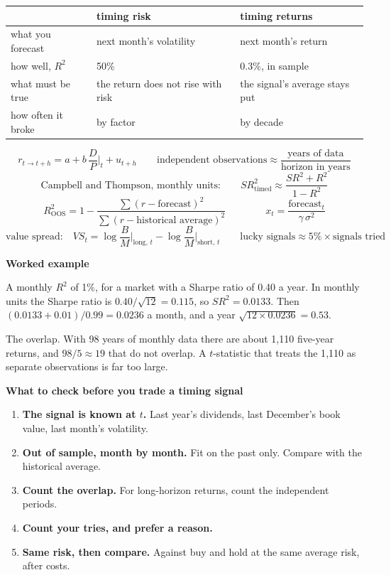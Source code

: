 \documentclass[11pt]{article}
\newcounter{ex}[section]
\newcommand{\head}[1]{\par\medskip\textbf{#1}\par}
\newcommand{\SR}{\mathit{SR}}
\begin{document}
\begin{center}
\begin{tabular}{lll}
\toprule
 & timing risk & timing returns \\
\midrule
what you forecast & next month's volatility & next month's return \\
how well, $R^{2}$ & 50\% & 0.3\%, in sample \\
what must be true & the return does not rise with risk & the signal's average stays put \\
how often it broke & by factor & by decade \\
\bottomrule
\end{tabular}
\end{center}

\begin{keybox}
\[ r_{t\to t+h} = a + b\,\frac{D}{P}\Big|_{t} + u_{t+h} \qquad
   \text{independent observations} \approx \frac{\text{years of data}}{\text{horizon in years}} \]
\[ \text{Campbell and Thompson, monthly units:}\qquad \SR^{2}_{\text{timed}} \approx \frac{\SR^{2} + R^{2}}{1 - R^{2}} \]
\[ R^{2}_{\text{OOS}} = 1 - \frac{\sum(r - \text{forecast})^{2}}{\sum(r - \text{historical average})^{2}}
   \qquad\qquad x_{t} = \frac{\text{forecast}_{t}}{\gamma\,\sigma^{2}} \]
\[ \text{value spread:}\quad VS_{t} = \log\frac{B}{M}\Big|_{\text{long},\,t} - \log\frac{B}{M}\Big|_{\text{short},\,t}
   \qquad \text{lucky signals} \approx 5\%\times\text{signals tried} \]
\end{keybox}

\head{Worked example}
A monthly $R^{2}$ of 1\%, for a market with a Sharpe ratio of 0.40 a year. In monthly units the Sharpe ratio is
$0.40/\sqrt{12} = 0.115$, so $\SR^{2} = 0.0133$. Then $(0.0133 + 0.01)/0.99 = 0.0236$ a month, and a year
$\sqrt{12\times 0.0236} = 0.53$.

The overlap. With 98 years of monthly data there are about 1{,}110 five-year returns, and $98/5 \approx 19$ that do not
overlap. A $t$-statistic that treats the 1{,}110 as separate observations is far too large.

\head{What to check before you trade a timing signal}
\begin{enumerate}[itemsep=1pt]
\item \textbf{The signal is known at $t$.} Last year's dividends, last December's book value, last month's volatility.
\item \textbf{Out of sample, month by month.} Fit on the past only. Compare with the historical average.
\item \textbf{Count the overlap.} For long-horizon returns, count the independent periods.
\item \textbf{Count your tries, and prefer a reason.}
\item \textbf{Same risk, then compare.} Against buy and hold at the same average risk, after costs.
\end{enumerate}
\end{document}
